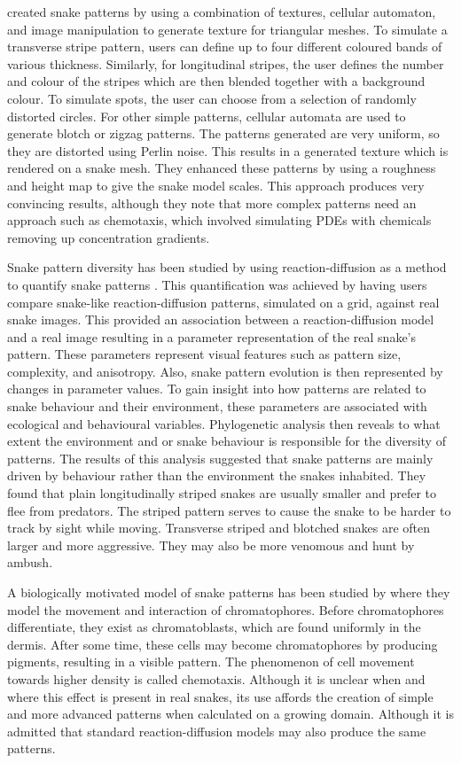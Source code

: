 \citet{pinheiro2017} created snake patterns by using a combination of textures, cellular automaton, and image manipulation to generate texture for triangular meshes. To simulate a transverse stripe pattern, users can define up to four different coloured bands of various thickness. Similarly, for longitudinal stripes, the user defines the number and colour of the stripes which are then blended together with a background colour. To simulate spots, the user can choose from a selection of randomly distorted circles. For other simple patterns, cellular automata are used to generate blotch or zigzag patterns. The patterns generated are very uniform, so they are distorted using Perlin noise. This results in a generated texture which is rendered on a snake mesh. They enhanced these patterns by using a roughness and height map to give the snake model scales. This approach produces very convincing results, although they note that more complex patterns need an approach such as chemotaxis, which involved simulating PDEs with chemicals removing up concentration gradients.

Snake pattern diversity has been studied by using reaction-diffusion as a method to quantify snake patterns \citep{Allen2013}. This quantification was achieved by having users compare snake-like reaction-diffusion patterns, simulated on a grid, against real snake images. This provided an association between a reaction-diffusion model and a real image resulting in a parameter representation of the real snake’s pattern. These parameters represent visual features such as pattern size, complexity, and anisotropy. Also, snake pattern evolution is then represented by changes in parameter values. To gain insight into how patterns are related to snake behaviour and their environment, these parameters are associated with ecological and behavioural variables. Phylogenetic analysis then reveals to what extent the environment and or  snake behaviour is responsible for the diversity of patterns. The results of this analysis suggested that snake patterns are mainly driven by behaviour rather than the environment the snakes inhabited. They found that plain longitudinally striped snakes are usually smaller and prefer to flee from predators. The striped pattern serves to cause the snake to be harder to track by sight while moving. Transverse striped and blotched snakes are often larger and more aggressive. They may also be more venomous and hunt by ambush.

A biologically motivated model of snake patterns has been studied by \citep{MURRAY1991} where they model the movement and interaction of chromatophores. Before chromatophores differentiate, they exist as chromatoblasts, which are found uniformly in the dermis. After some time, these cells may become chromatophores by producing pigments, resulting in a visible pattern. The phenomenon of cell movement towards higher density is called chemotaxis. Although it is unclear when and where this effect is present in real snakes, its use affords the creation of simple and more advanced patterns when calculated on a growing domain. Although it is admitted that standard reaction-diffusion models may also produce the same patterns.

